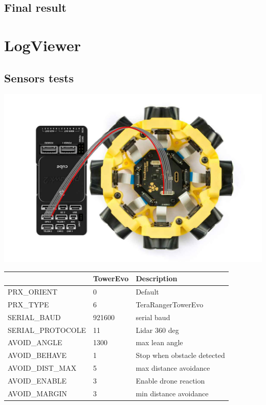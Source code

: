 \subsection{Final result}

\section{LogViewer}
\subsection{Sensors tests}
\begin{center}
    \includegraphics[width=0.65\linewidth]{./projects/logviewer/tower_evo_pixhawk.jpg}
\end{center}

\begin{table}[t]
    \centering
    \begin{tabular}{|l||l|l|}
    \hline
                      & TowerEvo & Description                 \\
    \hline
    PRX\_ORIENT       & 0        & Default                     \\
    PRX\_TYPE         & 6        & TeraRangerTowerEvo          \\
    SERIAL\_BAUD      & 921600   & serial baud                 \\
    SERIAL\_PROTOCOLE & 11       & Lidar 360 deg               \\
    AVOID\_ANGLE      & 1300     & max  lean angle             \\
    AVOID\_BEHAVE     & 1        & Stop when obstacle detected \\
    AVOID\_DIST\_MAX  & 5        & max distance avoidance      \\
    AVOID\_ENABLE     & 3        & Enable drone reaction       \\
    AVOID\_MARGIN     & 3        & min distance avoidance      \\
    \hline
    \end{tabular}
\end{table}

